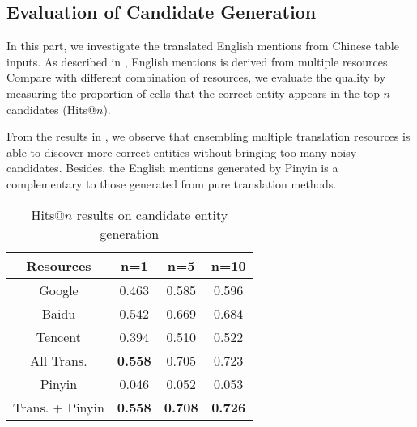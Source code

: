 \subsection{Evaluation of Candidate Generation}
\label{sec:exp-cand-gen-eval}


In this part, we investigate the translated English mentions from Chinese table inputs.
As described in , English mentions is derived from multiple resources.
Compare with different combination of resources, we evaluate the quality by
measuring the proportion of cells that the correct entity appears in the top-$n$ candidates
(Hits@$n$).

From the results in , we observe that
ensembling multiple translation resources is able to discover more correct entities 
without bringing too many noisy candidates.
Besides, the English mentions generated by Pinyin is a complementary to
those generated from pure translation methods.

\begin{table}[ht]
    \centering
    \caption{Hits@$n$ results on candidate entity generation}
    \label{tab:cand-gen-quality}
    \begin{tabular} {c|ccc}
        Resources   &   n=1     &   n=5     &   n=10    \\
        \hline
        Google      &   0.463   &   0.585   &   0.596   \\
        Baidu       &   0.542   &   0.669   &   0.684   \\
        Tencent     &   0.394   &   0.510   &   0.522   \\
        All Trans.  &   \textbf{0.558}   &   0.705   &   0.723   \\
        \hline
        Pinyin      &   0.046	&   0.052   &   0.053   \\
        \hline
        Trans. + Pinyin & \textbf{0.558}  & \textbf{0.708}  &  \textbf{0.726}   \\
    \end{tabular}
\end{table}


